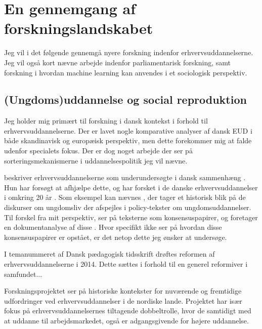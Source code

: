 \chapter{En gennemgang af forskningslandskabet}\label{sec:litreview}

Jeg vil i det følgende gennemgå nyere forskning indenfor erhvervsuddannelserne.
Jeg vil også kort nævne arbejde indenfor parliamentarisk forskning, samt forskning i hvordan machine learning kan anvendes i et sociologisk perspektiv.

\section{(Ungdoms)uddannelse og social reproduktion}
Jeg holder mig primært til forskning i dansk kontekst i forhold til erhvervsuddannelserne.
Der er lavet nogle komparative analyser af dansk EUD i både skandinavisk og europæisk perspektiv, men dette forekommer mig at falde udenfor specialets fokus.
Der er dog noget arbejde der ser på sorteringsmekanismerne i uddannelsespolitik jeg vil nævne.

\citeauthor{juulErhvervsuddannelserneForsomtForskningsomrade2004} beskriver erhvervsuddannelserne som underundersøgte i dansk sammenhæng \autocite{juulErhvervsuddannelserneForsomtForskningsomrade2004}.
Hun har forsøgt at afhjælpe dette, og har forsket i de danske erhvervsuddannelser i omkring 20 år \autocite{IdaJuulPublikationer}.
Som eksempel kan nævnes , der tager et historisk blik på de diskurser om ungdomsliv der afspejles i policy-tekster om ungdomsuddannelser.
Til forskel fra mit perspektiv, ser \citeauthor{juulDiskurserOmUngdom2013} på teksterne som konsensuspapirer, og foretager en dokumentanalyse af disse \autocite{juulDiskurserOmUngdom2013}.
Hvor \citeauthor{juulDiskurserOmUngdom2013} specifikt ikke ser på hvordan disse konsensuspapirer er opstået, er det netop dette jeg ønsker at undersøge.

I temanummeret  af Dansk pædagogisk tidsskrift drøftes reformen af erhvervsuddannelserne i 2014.
Dette sættes i forhold til en generel reformiver i samfundet...

Forskningsprojektet  ser på historiske kontekster for nuværende og fremtidige udfordringer ved erhvervsuddannelser i de nordiske lande.
Projektet har især fokus på erhvervsuddannelsernes tiltagende dobbeltrolle, hvor de samtidigt med at uddanne til arbejdsmarkedet, også er adgangsgivende for højere uddannelse.

